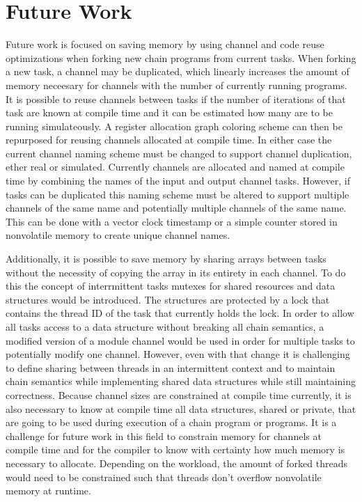 \documentclass[11pt]{sensys-proc}
\begin{document}
\section{Future Work}
Future work is focused on saving memory by using channel and code reuse optimizations when forking new chain programs from current tasks.
When forking a new task, a channel may be duplicated, which linearly increases the amount of memory neceesary for channels with the number of currently running programs.
It is possible to reuse channels between tasks if the number of iterations of that task are known at compile time and it can be estimated how
many are to be running simulateously. A register allocation graph coloring scheme can then be repurposed for reusing channels allocated at compile time.
In either case the current channel naming scheme must be changed to support channel duplication, ether real or simulated.
Currently channels are allocated and named at compile time by combining the names of the input and output channel tasks.
However, if tasks can be duplicated this naming scheme must be altered to support multiple channels of the same name and potentially multiple channels of the same name.
This can be done with a vector clock timestamp or a simple counter stored in nonvolatile memory to create unique channel names.

Additionally, it is possible to save memory by sharing arrays between tasks without the necessity of copying the array in its entirety in each channel.
To do this the concept of interrmittent tasks mutexes for shared resources and data structures would be introduced.
The structures are protected by a lock that contains the thread ID of the task that currently holds the lock.
In order to allow all tasks access to a data structure without breaking all chain semantics, a modified version of a module channel would be used in order
for multiple tasks to potentially modify one channel.
However, even with that change it is challenging to define sharing between threads in an intermittent context and to maintain chain semantics while implementing
shared data structures while still maintaining correctness.
Because channel sizes are constrained at compile time currently, it is also necessary to know at compile time all data structures, shared or private,
that are going to be used during execution of a chain program or programs.
It is a challenge for future work in this field to constrain memory for channels at compile time and for the compiler to know with certainty how much memory
is necessary to allocate. Depending on the workload, the amount of forked threads would need to be constrained such that threads don't overflow nonvolatile memory at runtime.
\end{document}
